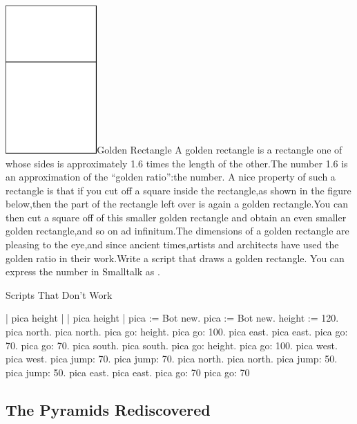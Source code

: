 \documentclass[a4paper,10pt,twoside]{book}
\begin{document}
\begin{exofigwithsizeandtitle}[0.6]{\includegraphics[width=3.5cm]{varGoldenRec}}{Golden Rectangle}
A golden rectangle is a rectangle one of whose sides is approximately 1.6 times the length of the other.The number 1.6 is an approximation of the “golden ratio”:the number. A nice property of such a rectangle is that if you cut off a square inside the rectangle,as shown in the figure below,then the part of the rectangle left over is again a golden rectangle.You can then cut a square off of this smaller golden rectangle and obtain an even smaller golden rectangle,and so on ad infinitum.The dimensions of a golden rectangle are pleasing to the eye,and since ancient times,artists and architects have used the golden ratio in their work.Write a script that draws a golden rectangle. You can express the number  in Smalltalk as .
\end{exofigwithsizeandtitle}


\begin{exonofigtitle}{Scripts That Don’t Work}
\begin{code}{}
| pica height |                      | pica height | 
pica := Bot new.                     pica := Bot new. 
height := 120.                       pica north. 
pica north.                          pica go: height. 
pica go: 100.                        pica east. 
pica east.                           pica go: 70. 
pica go: 70.                         pica south. 
pica south.                          pica go: height. 
pica go: 100.                        pica west. 
pica west.                           pica jump: 70. 
pica jump: 70.                       pica north. 
pica north.                          pica jump: 50. 
pica jump: 50.                       pica east. 
pica east.                           pica go: 70 
pica go: 70 	
\end{code}
\end{exonofigtitle}


\subsection{The Pyramids Rediscovered}
\end{document}
